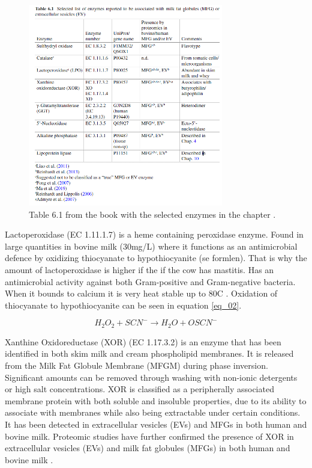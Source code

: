 \begin{figure}[h]
    \centering
    \includegraphics*[width=0.8\linewidth]{Figures/table_01.png}
    \caption{Table 6.1 from the book with the selected enzymes in the chapter \cite*{RM_01}.}
    \label{fig_01}
\end{figure}

\vline 

Lactoperoxidase (EC 1.11.1.7) is a heme containing peroxidase enzyme. Found in large quantities in bovine milk (30mg/L) where it functions as an antimicrobial defence by oxidizing thiocyanate to hypothiocyanite (se formlen). That is why the amount of lactoperoxidase is higher if the if the cow has mastitis. Has an antimicrobial activity against both Gram-positive and Gram-negative bacteria. When it bounds to calcium it is very heat stable up to 80\textdegree C \cite*{RM_01}. Oxidation of thiocyanate to hypothiocyanite can be seen in equation \ref*{eq_02}.

\begin{equation}
    H_2O_2 + SCN^- \rightarrow H_2O + OSCN^-
    \label{eq_02}
\end{equation}

\vline 

Xanthine Oxidoreductase (XOR) (EC 1.17.3.2) is an enzyme that has been identified in both skim milk and cream phospholipid membranes. It is released from the Milk Fat Globule Membrane (MFGM) during phase inversion. Significant amounts can be removed through washing with non-ionic detergents or high salt concentrations. XOR is classified as a peripherally associated membrane protein with both soluble and insoluble properties, due to its ability to associate with membranes while also being extractable under certain conditions. It has been detected in extracellular vesicles (EVs) and MFGs in both human and bovine milk. Proteomic studies have further confirmed the presence of XOR in extracellular vesicles (EVs) and milk fat globules (MFGs) in both human and bovine milk \cite*{RM_01}.

